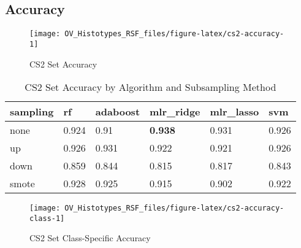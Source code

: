 \documentclass[
]{report}
\begin{document}
\hypertarget{accuracy-2}{%
\subsection{Accuracy}\label{accuracy-2}}

\begin{figure}[H]

{\centering \texttt{[image: OV\_Histotypes\_RSF\_files/figure-latex/cs2-accuracy-1]} 

}

\caption{CS2 Set Accuracy}\label{fig:cs2-accuracy}
\end{figure}

\begin{table}

\caption{\label{tab:cs2-accuracy-table}CS2 Set Accuracy by Algorithm and Subsampling Method}
\centering
\begin{tabular}[t]{l|l|l|l|l|l}
\hline
sampling & rf & adaboost & mlr\_ridge & mlr\_lasso & svm\\
\hline
none & 0.924 & 0.91 & \textbf{0.938} & 0.931 & 0.926\\
\hline
up & 0.926 & 0.931 & 0.922 & 0.921 & 0.926\\
\hline
down & 0.859 & 0.844 & 0.815 & 0.817 & 0.843\\
\hline
smote & 0.928 & 0.925 & 0.915 & 0.902 & 0.922\\
\hline
\end{tabular}
\end{table}

\begin{figure}[H]

{\centering \texttt{[image: OV\_Histotypes\_RSF\_files/figure-latex/cs2-accuracy-class-1]} 

}

\caption{CS2 Set Class-Specific Accuracy}\label{fig:cs2-accuracy-class}
\end{figure}
\end{document}
